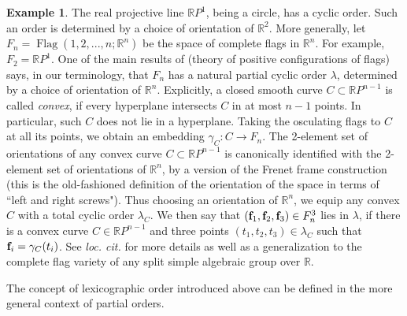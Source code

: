 \documentclass[english,11pt,leqno]{article}
\def\RR{\mathbb{R}}
\def\on{\operatorname}
\theoremstyle{definition}
\newtheorem{exa}[thm]{Example}
\theoremstyle{remark}
\numberwithin{equation}{section}
\begin{document}
\begin{exa} The real projective line $\RR P^1$, being a circle, has a cyclic order. Such an order is
	determined by a choice of orientation of $\RR^2$.  More generally, let
	$F_n=\on{Flag}(1,2,...,n; \RR^n)$ be the space of complete flags in $\RR^n$.  For example,
	$F_2=\RR P^1$.  One of the main results of \cite{fock-goncharov} (theory of positive
	configurations of flags) says, in our terminology, that $F_n$ has a natural partial cyclic
	order $\lambda$, determined by a choice of orientation of $\RR^n$.  Explicitly, a closed
	smooth curve $C\subset \RR P^{n-1}$ is called {\em convex}, if every hyperplane intersects
	$C$ in at most $n-1$ points.  In particular, such $C$ does not lie in a hyperplane. Taking
	the osculating flags to $C$ at all its points, we obtain an embedding $\gamma_C: C\to F_n$.
	The 2-element set of orientations of any convex curve  $C\subset \RR P^{n-1}$ is canonically
	identified with the 2-element set of orientations of $\RR^n$, by a version of the Frenet
	frame construction (this is the old-fashioned definition of the orientation of the
	space in terms of ``left and right screws").
	  Thus choosing an orientation of $\RR^n$, we equip any convex $C$ with a
	total cyclic order $\lambda_C$.  We then say that $({\bf f}_1, {\bf f}_2, {\bf f}_3)\in
	F_n^3$ lies in $\lambda$, if there is a convex curve $C\in \RR P^{n-1}$ and three points
	$(t_1, t_2, t_3)\in\lambda_C$ such that ${\bf f}_i=\gamma_C(t_i)$.  See {\em loc. cit.} for
	more details as well as a generalization to the complete flag variety of any split simple
	algebraic group over $\RR$.
\end{exa}

The concept of lexicographic order introduced above can be defined in the more general context of
partial orders.
\end{document}
